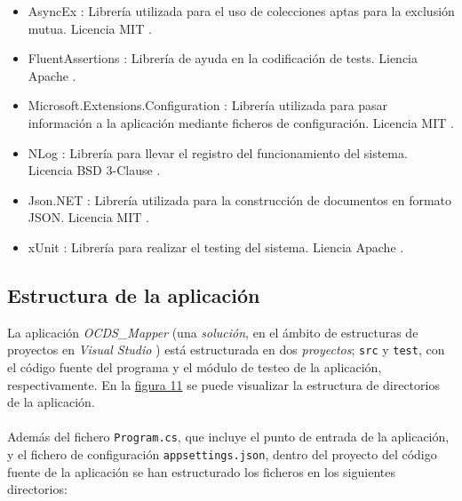             \begin{itemize}
                \item AsyncEx \cite{LIBASYNC}: Librería utilizada para el uso de colecciones aptas para la exclusión mutua. Licencia MIT \cite{LICMIT}.
                \item FluentAssertions \cite{LIBASSERT}: Librería de ayuda en la codificación de tests. Liencia Apache \cite{LICAPACHE}.
                \item Microsoft.Extensions.Configuration \cite{LIBCONFIG}: Librería utilizada para pasar información a la aplicación mediante ficheros de configuración. Licencia MIT \cite{LICMIT}.
                \item NLog \cite{LIBNLOG}: Librería para llevar el registro del funcionamiento del sistema. Licencia BSD 3-Clause \cite{LICBSD3}.
                \item Json.NET \cite{LIBJSON}: Librería utilizada para la construcción de documentos en formato JSON. Licencia MIT \cite{LICMIT}.
                \item xUnit \cite{LIBXUNIT}: Librería para realizar el testing del sistema. Liencia Apache \cite{LICAPACHE}.
            \end{itemize}   
    
    \subsection{Estructura de la aplicación}
        La aplicación \textit{OCDS\_Mapper} (una \textit{solución}, en el ámbito de estructuras de proyectos en \textit{Visual Studio} \cite{VSPROJSOL}) está estructurada en dos \textit{proyectos}; \texttt{src} y \texttt{test}, con el código fuente del programa y el módulo de testeo de la aplicación, respectivamente. En la \hyperref[fig:estructura]{figura 11} se puede visualizar la estructura de directorios de la aplicación.
        \\ \\
        Además del fichero \texttt{Program.cs}, que incluye el punto de entrada de la aplicación, y el fichero de configuración \texttt{appsettings.json}, dentro del proyecto del código fuente de la aplicación se han estructurado los ficheros en los siguientes directorios:
        
